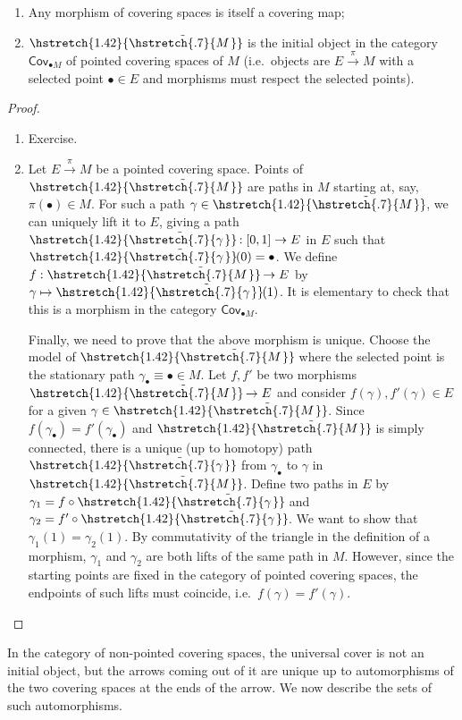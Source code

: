 \documentclass[english,letterpaper]{article}%
\numberwithin{equation}{section}
\numberwithin{figure}{section}
\numberwithin{table}{section}
\theoremstyle{definition}
\theoremstyle{definition}
\theoremstyle{definition}
\theoremstyle{plain}
\theoremstyle{plain}
\theoremstyle{plain}
\theoremstyle{plain}
\theoremstyle{remark}
\theoremstyle{remark}
\newcommand\wt[1]{\hstretch{1.42}{\tilde{\hstretch{.7}{#1\mkern2mu}}}\mkern-2mu}
\begin{document}
\begin{prop}
    \begin{enumerate}
       \item Any morphism of covering spaces is itself a covering map;
        \item $\wt{M}$ is the initial object in the category $\mathsf{Cov}_{\bullet M}$ of pointed covering spaces of $M$ (i.e.\ objects are $E\overset\pi\to M$ with a selected point $\bullet\in E$ and morphisms must respect the selected points).
    \end{enumerate}
\end{prop}
\begin{proof}
    \begin{enumerate}
      \item Exercise.
      \item Let $E\overset\pi\to M$ be a pointed covering space. Points of $\wt{M}$ are paths in $M$ starting at, say, $\pi(\bullet)\in M$. For such a path $\gamma\in\wt{M}$, we can uniquely lift it to $E$, giving a path $\wt{\gamma}:[0,1]\to E$ in $E$ such that $\wt{\gamma}(0)=\bullet$. We define $f:\wt{M}\to E$ by $\gamma\mapsto \wt{\gamma}(1)$. It is elementary to check that this is a morphism in the category $\mathsf{Cov}_{\bullet M}$.
    
      Finally, we need to prove that the above morphism is unique. Choose the model of $\wt{M}$ where the selected point is the stationary path $\gamma_\bullet\equiv \bullet \in M$. Let $f,f'$ be two morphisms $\wt{M}\to E$ and consider $f(\gamma),f'(\gamma)\in E$ for a given $\gamma\in \wt{M}$. Since $f(\gamma_\bullet)=f'(\gamma_\bullet)$ and $\wt{M}$ is simply connected, there is a unique (up to homotopy) path $\wt\gamma$ from $\gamma_\bullet$ to $\gamma$ in $\wt{M}$. Define two paths in $E$ by $\gamma_1=f\circ\wt\gamma$ and $\gamma_2=f'\circ\wt\gamma$. We want to show that $\gamma_1(1)=\gamma_2(1)$. By commutativity of the triangle in the definition of a morphism, $\gamma_1$ and $\gamma_2$ are  both lifts of the same path in $M$. However, since the starting points are fixed in the category of pointed covering spaces, the endpoints of such lifts must coincide, i.e.\ $f(\gamma)=f'(\gamma)$.
    \end{enumerate}
\end{proof}

In the category of non-pointed covering spaces, the universal cover is not an initial object, but the arrows coming out of it are unique up to automorphisms of the two covering spaces at the ends of the arrow. We now describe the sets of such automorphisms.
\end{document}
